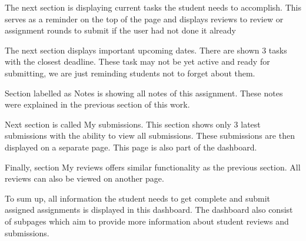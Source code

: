The next section is displaying current tasks the student needs to accomplish. This serves as a reminder on the top of the page and displays reviews to review or assignment rounds to submit if the user had not done it already

The next section displays important upcoming dates. There are shown 3 tasks with the closest deadline. These task may not be yet active and ready for submitting, we are just reminding students not to forget about them. 

Section labelled as Notes is showing all notes of this assignment. These notes were explained in the previous section of this work.

Next section is called My submissions. This section shows only 3 latest submissions with the ability to view all submissions. These submissions are then displayed on a separate page. This page is also part of the dashboard.

Finally, section My reviews offers similar functionality as the previous section. All reviews can also be viewed on another page.

To sum up, all information the student needs to get complete and submit assigned assignments is displayed in this dashboard. The dashboard also consist of subpages which aim to provide more information about student reviews and submissions. 



